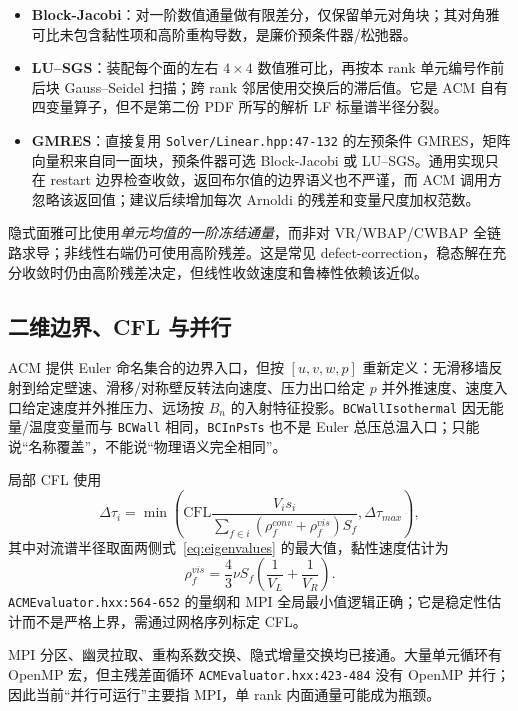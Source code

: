 \documentclass[UTF8,11pt,a4paper]{ctexart}
\newcommand{\code}[1]{\nolinkurl{#1}}
\begin{document}
\begin{itemize}
  \item \textbf{Block-Jacobi}：对一阶数值通量做有限差分，仅保留单元对角块；其对角雅可比未包含黏性项和高阶重构导数，是廉价预条件器/松弛器。
  \item \textbf{LU--SGS}：装配每个面的左右 $4\times4$ 数值雅可比，再按本 rank 单元编号作前后块 Gauss--Seidel 扫描；跨 rank 邻居使用交换后的滞后值。它是 ACM 自有四变量算子，但不是第二份 PDF 所写的解析 LF 标量谱半径分裂。
  \item \textbf{GMRES}：直接复用 \code{Solver/Linear.hpp:47-132} 的左预条件 GMRES，矩阵向量积来自同一面块，预条件器可选 Block-Jacobi 或 LU--SGS。通用实现只在 restart 边界检查收敛，返回布尔值的边界语义也不严谨，而 ACM 调用方忽略该返回值；建议后续增加每次 Arnoldi 的残差和变量尺度加权范数。
\end{itemize}

隐式面雅可比使用\emph{单元均值的一阶冻结通量}，而非对 VR/WBAP/CWBAP 全链路求导；非线性右端仍可使用高阶残差。这是常见 defect-correction，稳态解在充分收敛时仍由高阶残差决定，但线性收敛速度和鲁棒性依赖该近似。

\subsection{二维边界、CFL 与并行}

ACM 提供 Euler 命名集合的边界入口，但按 $[u,v,w,p]$ 重新定义：无滑移墙反射到给定壁速、滑移/对称壁反转法向速度、压力出口给定 $p$ 并外推速度、速度入口给定速度并外推压力、远场按 $B_n$ 的入射特征投影。\code{BCWallIsothermal} 因无能量/温度变量而与 \code{BCWall} 相同，\code{BCInPsTs} 也不是 Euler 总压总温入口；只能说“名称覆盖”，不能说“物理语义完全相同”。

局部 CFL 使用
\begin{equation}
 \Delta\tau_i=\min\left(
 \mathrm{CFL}\frac{V_i s_i}{\sum_{f\in i}(\rho_f^{conv}+\rho_f^{vis})S_f},
 \Delta\tau_{max}\right),
 \label{eq:cfl}
\end{equation}
其中对流谱半径取面两侧式~\eqref{eq:eigenvalues} 的最大值，黏性速度估计为
\begin{equation}
 \rho_f^{vis}=\frac43\nu S_f\left(\frac1{V_L}+\frac1{V_R}\right).
\end{equation}
\code{ACMEvaluator.hxx:564-652} 的量纲和 MPI 全局最小值逻辑正确；它是稳定性估计而不是严格上界，需通过网格序列标定 CFL。

MPI 分区、幽灵拉取、重构系数交换、隐式增量交换均已接通。大量单元循环有 OpenMP 宏，但主残差面循环 \code{ACMEvaluator.hxx:423-484} 没有 OpenMP 并行；因此当前“并行可运行”主要指 MPI，单 rank 内面通量可能成为瓶颈。
\end{document}
